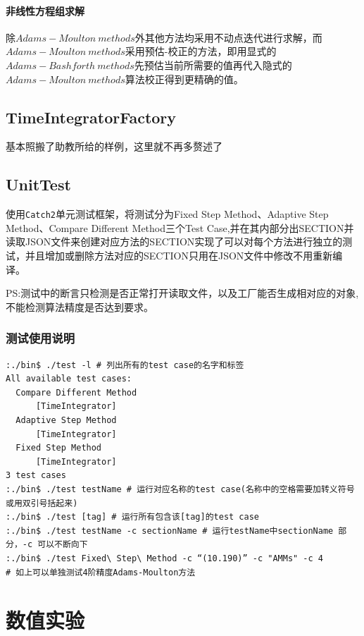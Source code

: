 \documentclass{article}
\begin{document}
\paragraph{非线性方程组求解} 除$Adams-Moulton\ methods$外其他方法均采用不动点迭代进行求解，而$Adams-Moulton\ methods$采用预估-校正的方法，即用显式的$Adams-Bashforth\ methods$先预估当前所需要的值再代入隐式的$Adams-Moulton\ methods$算法校正得到更精确的值。

\subsection{TimeIntegratorFactory}

基本照搬了助教所给的样例，这里就不再多赘述了

\subsection{UnitTest}

使用\verb|Catch2|单元测试框架，将测试分为Fixed Step Method、Adaptive Step Method、Compare Different Method三个Test Case,并在其内部分出SECTION并读取JSON文件来创建对应方法的SECTION实现了可以对每个方法进行独立的测试，并且增加或删除方法对应的SECTION只用在JSON文件中修改不用重新编译。

PS:测试中的断言只检测是否正常打开读取文件，以及工厂能否生成相对应的对象,不能检测算法精度是否达到要求。

\subsubsection{测试使用说明}

\begin{verbatim}
:./bin$ ./test -l # 列出所有的test case的名字和标签
All available test cases:
  Compare Different Method
      [TimeIntegrator]
  Adaptive Step Method
      [TimeIntegrator]
  Fixed Step Method
      [TimeIntegrator]
3 test cases
:./bin$ ./test testName # 运行对应名称的test case(名称中的空格需要加转义符号或用双引号括起来)
:./bin$ ./test [tag] # 运行所有包含该[tag]的test case 
:./bin$ ./test testName -c sectionName # 运行testName中sectionName 部分，-c 可以不断向下
:./bin$ ./test Fixed\ Step\ Method -c “(10.190)” -c "AMMs" -c 4
# 如上可以单独测试4阶精度Adams-Moulton方法
\end{verbatim}

\section{数值实验}
\end{document}
